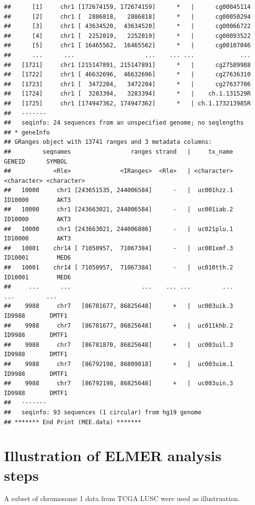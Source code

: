 \documentclass{article}\usepackage[]{graphicx}\usepackage[usenames,dvipsnames]{color}
\makeatletter
\newenvironment{kframe}{%
 \def\at@end@of@kframe{}%
 \ifinner\ifhmode%
  \def\at@end@of@kframe{\end{minipage}}%
  \begin{minipage}{\columnwidth}%
 \fi\fi%
 \def\FrameCommand##1{\hskip\@totalleftmargin \hskip-\fboxsep
 \colorbox{shadecolor}{##1}\hskip-\fboxsep
     \hskip-\linewidth \hskip-\@totalleftmargin \hskip\columnwidth}%
 \MakeFramed {\advance\hsize-\width
   \@totalleftmargin\z@ \linewidth\hsize
   \@setminipage}}%
 {\par\unskip\endMakeFramed%
 \at@end@of@kframe}
\newenvironment{knitrout}{}{} %
\makeatother
\begin{document}
\begin{knitrout}
\begin{kframe}
\begin{verbatim}
##      [1]     chr1 [172674159, 172674159]      *   |      cg00045114
##      [2]     chr1 [  2886818,   2886818]      *   |      cg00050294
##      [3]     chr1 [ 43634520,  43634520]      *   |      cg00066722
##      [4]     chr1 [  2252019,   2252019]      *   |      cg00093522
##      [5]     chr1 [ 16465562,  16465562]      *   |      cg00107046
##      ...      ...                    ...    ... ...             ...
##   [1721]     chr1 [215147891, 215147891]      *   |      cg27589988
##   [1722]     chr1 [ 46632696,  46632696]      *   |      cg27636310
##   [1723]     chr1 [  3472204,   3472204]      *   |      cg27637706
##   [1724]     chr1 [  3283394,   3283394]      *   |    ch.1.131529R
##   [1725]     chr1 [174947362, 174947362]      *   | ch.1.173213985R
##   -------
##   seqinfo: 24 sequences from an unspecified genome; no seqlengths
## * geneInfo 
## GRanges object with 13741 ranges and 3 metadata columns:
##         seqnames                 ranges strand   |     tx_name      GENEID      SYMBOL
##            <Rle>              <IRanges>  <Rle>   | <character> <character> <character>
##   10000     chr1 [243651535, 244006584]      -   |  uc001hzz.1     ID10000        AKT3
##   10000     chr1 [243663021, 244006584]      -   |  uc001iab.2     ID10000        AKT3
##   10000     chr1 [243663021, 244006886]      -   |  uc021plu.1     ID10000        AKT3
##   10001    chr14 [ 71050957,  71067384]      -   |  uc001xmf.3     ID10001        MED6
##   10001    chr14 [ 71050957,  71067384]      -   |  uc010tth.2     ID10001        MED6
##     ...      ...                    ...    ... ...         ...         ...         ...
##    9988     chr7   [86781677, 86825648]      +   |  uc003uik.3      ID9988       DMTF1
##    9988     chr7   [86781677, 86825648]      +   |  uc011khb.2      ID9988       DMTF1
##    9988     chr7   [86781870, 86825648]      +   |  uc003uil.3      ID9988       DMTF1
##    9988     chr7   [86792198, 86809018]      +   |  uc003uim.1      ID9988       DMTF1
##    9988     chr7   [86792198, 86825648]      +   |  uc003uin.3      ID9988       DMTF1
##   -------
##   seqinfo: 93 sequences (1 circular) from hg19 genome
## ******* End Print (MEE.data) *******
\end{verbatim}
\end{kframe}
\end{knitrout}

\section{Illustration of ELMER analysis steps}
A subset of chromosome 1 data from TCGA LUSC were used as illustruation. 
\end{document}
